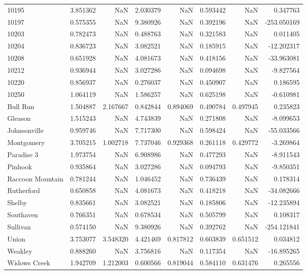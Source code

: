 \begin{tabular}{lrrrrrrr}
10195 & 3.851362 & NaN & 2.030379 & NaN & 0.593442 & NaN & 0.347763 \\
10197 & 0.575355 & NaN & 9.380926 & NaN & 0.392196 & NaN & -253.050169 \\
10203 & 0.782473 & NaN & 0.488763 & NaN & 0.321583 & NaN & 0.011405 \\
10204 & 0.836723 & NaN & 3.082521 & NaN & 0.185915 & NaN & -12.202317 \\
10208 & 0.651928 & NaN & 4.081673 & NaN & 0.418156 & NaN & -33.963081 \\
10212 & 0.936944 & NaN & 3.027286 & NaN & 0.094698 & NaN & -9.827564 \\
10220 & 0.856937 & NaN & 0.276037 & NaN & 0.450907 & NaN & 0.186595 \\
10250 & 1.064119 & NaN & 1.586257 & NaN & 0.625198 & NaN & -0.610981 \\
Bull Run & 1.504887 & 2.167667 & 0.842844 & 0.894069 & 0.490784 & 0.497945 & 0.235823 \\
Gleason & 1.515243 & NaN & 4.743839 & NaN & 0.271808 & NaN & -8.099653 \\
Johnsonville & 0.959746 & NaN & 7.717300 & NaN & 0.598424 & NaN & -55.033566 \\
Montgomery & 3.705215 & 1.002718 & 7.737046 & 0.929368 & 0.261118 & 0.429772 & -3.269864 \\
Paradise 3 & 1.973754 & NaN & 6.908986 & NaN & 0.477293 & NaN & -8.911543 \\
Pinhook & 0.935864 & NaN & 3.027286 & NaN & 0.094793 & NaN & -9.850351 \\
Raccoon Mountain & 0.781244 & NaN & 1.046452 & NaN & 0.736439 & NaN & 0.178314 \\
Rutherford & 0.650858 & NaN & 4.081673 & NaN & 0.418218 & NaN & -34.082666 \\
Shelby & 0.835661 & NaN & 3.082521 & NaN & 0.185806 & NaN & -12.235894 \\
Southaven & 0.766351 & NaN & 0.678534 & NaN & 0.505799 & NaN & 0.108317 \\
Sullivan & 0.574150 & NaN & 9.380926 & NaN & 0.392762 & NaN & -254.121841 \\
Union & 3.753077 & 3.548320 & 4.421469 & 0.817812 & 0.603839 & 0.651512 & 0.034812 \\
Weakley & 0.888260 & NaN & 3.756816 & NaN & 0.117354 & NaN & -16.895265 \\
Widows Creek & 1.942709 & 1.212003 & 0.600566 & 0.819044 & 0.584110 & 0.631476 & 0.265556 \\
\bottomrule
\end{tabular}
